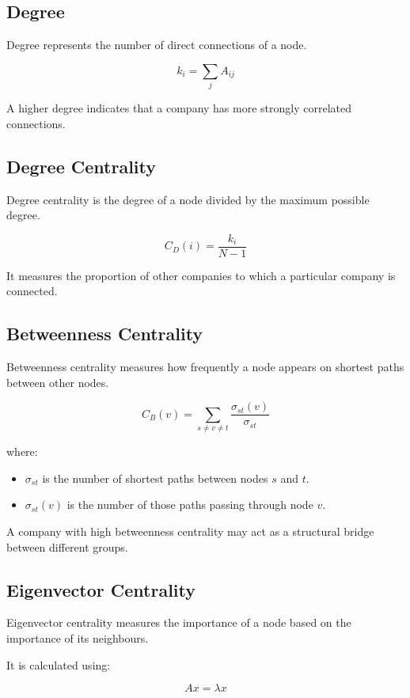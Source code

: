 \documentclass[11pt,a4paper]{article}
\begin{document}
\subsection{Degree}

Degree represents the number of direct connections
of a node.

\[
k_i=\sum_j A_{ij}
\]

A higher degree indicates that a company has more
strongly correlated connections.

\subsection{Degree Centrality}

Degree centrality is the degree of a node divided
by the maximum possible degree.

\[
C_D(i)=\frac{k_i}{N-1}
\]

It measures the proportion of other companies to which
a particular company is connected.

\subsection{Betweenness Centrality}

Betweenness centrality measures how frequently a node
appears on shortest paths between other nodes.

\[
C_B(v)=
\sum_{s\neq v\neq t}
\frac{\sigma_{st}(v)}{\sigma_{st}}
\]

where:

\begin{itemize}
    \item $\sigma_{st}$ is the number of shortest paths
    between nodes $s$ and $t$.
    \item $\sigma_{st}(v)$ is the number of those paths
    passing through node $v$.
\end{itemize}

A company with high betweenness centrality may act as
a structural bridge between different groups.

\subsection{Eigenvector Centrality}

Eigenvector centrality measures the importance of a node
based on the importance of its neighbours.

It is calculated using:

\[
Ax=\lambda x
\]
\end{document}
